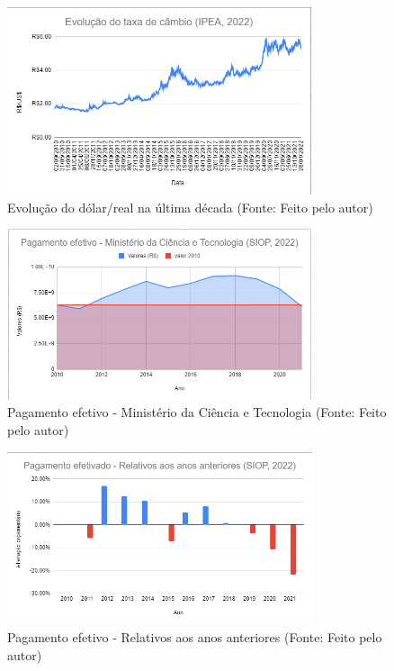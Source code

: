 \begin{figure}[!h]
    \centering
    \includegraphics[width=0.8\textwidth]{04-figuras/dolar.png}
    \caption[Evolução do dólar/real na última década ]{Evolução do dólar/real na última década (Fonte: Feito pelo autor)}
    \label{fig:dolar}
\end{figure}
\begin{figure}[!h]
    \centering
    \includegraphics[width=0.8\textwidth]{04-figuras/compartive.png}
    \caption[Pagamento efetivo - Ministério da Ciência e Tecnologia ]{Pagamento efetivo - Ministério da Ciência e Tecnologia (Fonte: Feito pelo autor)}
    \label{fig:quedaorca1}
\end{figure}
\begin{figure}[!h]
    \centering
    \includegraphics[width=0.8\textwidth]{04-figuras/compartive_last .png}
    \caption[Pagamento efetivo - Relativos aos anos anteriores ]{Pagamento efetivo - Relativos aos anos anteriores (Fonte: Feito pelo autor)}
    \label{fig:quedaorca}
\end{figure}

